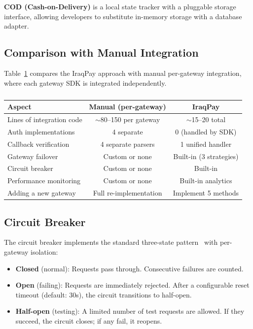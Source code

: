 \documentclass[10pt, a4paper, oneside]{article}
\begin{document}
\textbf{COD (Cash-on-Delivery)} is a local state tracker with a pluggable storage interface, allowing developers to substitute in-memory storage with a database adapter.

\subsection{Comparison with Manual Integration}

Table~\ref{table:comparison} compares the IraqPay approach with manual per-gateway integration, where each gateway SDK is integrated independently.

\begin{table}[ht]
    \centering
    \setlength\tabcolsep{3pt}
    \small
    \begin{tabular}{lcc}
        \toprule
        \bfseries Aspect & \bfseries Manual (per-gateway) & \bfseries IraqPay \\
        \midrule
        Lines of integration code & $\sim$80--150 per gateway & $\sim$15--20 total \\
        Auth implementations & 4 separate & 0 (handled by SDK) \\
        Callback verification & 4 separate parsers & 1 unified handler \\
        Gateway failover & Custom or none & Built-in (3 strategies) \\
        Circuit breaker & Custom or none & Built-in \\
        Performance monitoring & Custom or none & Built-in analytics \\
        Adding a new gateway & Full re-implementation & Implement 5 methods \\
        \bottomrule
    \end{tabular}
    \caption{\fontsize{10pt}{11pt}}
    \label{table:comparison}
\end{table}

\subsection{Circuit Breaker}

The circuit breaker implements the standard three-state pattern~\cite{nygard2018,fowler2014} with per-gateway isolation:

\begin{itemize}
\item \textbf{Closed} (normal): Requests pass through. Consecutive failures are counted.
\item \textbf{Open} (failing): Requests are immediately rejected. After a configurable reset timeout (default: 30s), the circuit transitions to half-open.
\item \textbf{Half-open} (testing): A limited number of test requests are allowed. If they succeed, the circuit closes; if any fail, it reopens.
\end{itemize}
\end{document}
